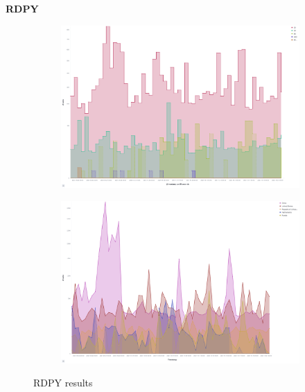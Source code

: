 \textbf{RDPY}

\begin{figure}
    \centering

    \begin{subfigure}[b]{0.49\textwidth}
        \centering
        \includegraphics[width=\textwidth]{figures/tpot-cowire-attacks.png}
        \caption{}
        \label{fig:tpot-rdpy-attacks}
    \end{subfigure}
    \hfill
    \begin{subfigure}[b]{0.49\textwidth}
        \centering
        \includegraphics[width=\textwidth]{figures/tpot-cowire-country.png}
        \caption{}
        \label{fig:tpot-rdpy-country}
    \end{subfigure}
    \caption[RDPY results]{RDPY results}
    \label{fig:rdpy-results}
\end{figure}


